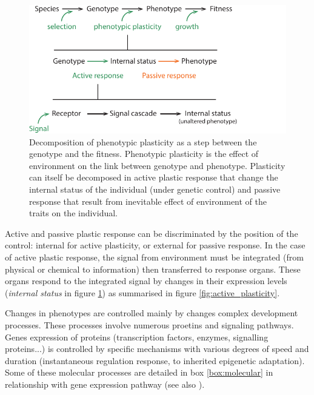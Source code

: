 \begin{figure}
    \includegraphics[width=1\linewidth]{./2_PP/Figures/Concepts/genotype_to_phenotype.pdf}
  \caption[Decomposition of plastic response]{Decomposition of phenotypic plasticity as a step between the genotype and the fitness. Phenotypic plasticity is the effect of environment on the link between genotype and phenotype. Plasticity can itself be decomposed in active plastic response that change the internal status of the individual (under genetic control) and passive response that result from inevitable effect of environment of the traits on the individual.}
  \label{fig:plasticity_form}
\end{figure}

Active and passive plastic response can be discriminated by the position of the control: internal for active plasticity, or external for passive response. In the case of active plastic response, the signal from environment must be integrated (from physical or chemical to information) then transferred to response organs. These organs respond to the integrated signal by changes in their expression levels (\textit{internal status} in figure \ref{fig:plasticity_form}) as summarised in figure \ref{fig:active_plasticity}.

Changes in phenotypes are controlled mainly by changes complex development processes. These processes involve numerous proetins and signaling pathways. Genes expression of proteins (transcription factors, enzymes, signalling proteins...) is controlled by specific mechanisms with various degrees of speed and duration (instantaneous regulation response, to inherited epigenetic adaptation). Some of these molecular processes are detailed in box \ref{box:molecular} in relationship with gene expression pathway (see also \cite{nicotra_plant_2010}).


